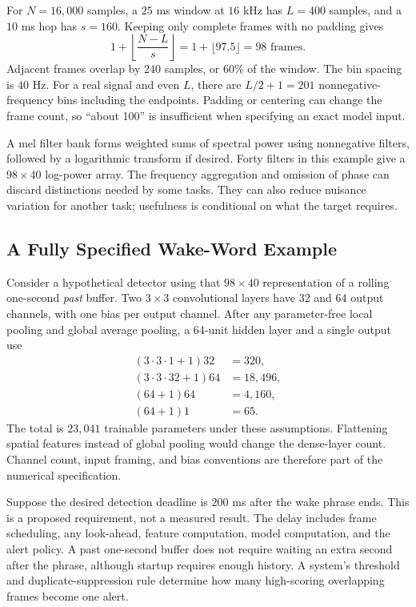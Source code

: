 For $N=16{,}000$ samples, a $25$ ms window at $16$ kHz has $L=400$ samples, and a $10$ ms hop has $s=160$. Keeping only complete frames with no padding gives
\[
 1+\left\lfloor\frac{N-L}{s}\right\rfloor
 =1+\lfloor97.5\rfloor=98\text{ frames}.
\]
Adjacent frames overlap by $240$ samples, or $60\%$ of the window. The bin spacing is $40$ Hz. For a real signal and even $L$, there are $L/2+1=201$ nonnegative-frequency bins including the endpoints. Padding or centering can change the frame count, so ``about 100'' is insufficient when specifying an exact model input.

A mel filter bank forms weighted sums of spectral power using nonnegative filters, followed by a logarithmic transform if desired. Forty filters in this example give a $98\times40$ log-power array. The frequency aggregation and omission of phase can discard distinctions needed by some tasks. They can also reduce nuisance variation for another task; usefulness is conditional on what the target requires.

\subsection{A Fully Specified Wake-Word Example}

Consider a hypothetical detector using that $98\times40$ representation of a rolling one-second \emph{past} buffer. Two $3\times3$ convolutional layers have 32 and 64 output channels, with one bias per output channel. After any parameter-free local pooling and global average pooling, a 64-unit hidden layer and a single output use
\begin{align*}
 (3\cdot3\cdot1+1)32&=320,\\
 (3\cdot3\cdot32+1)64&=18{,}496,\\
 (64+1)64&=4{,}160,\\
 (64+1)1&=65.
\end{align*}
The total is $23{,}041$ trainable parameters under these assumptions. Flattening spatial features instead of global pooling would change the dense-layer count. Channel count, input framing, and bias conventions are therefore part of the numerical specification.

Suppose the desired detection deadline is $200$ ms after the wake phrase ends. This is a proposed requirement, not a measured result. The delay includes frame scheduling, any look-ahead, feature computation, model computation, and the alert policy. A past one-second buffer does not require waiting an extra second after the phrase, although startup requires enough history. A system's threshold and duplicate-suppression rule determine how many high-scoring overlapping frames become one alert.

